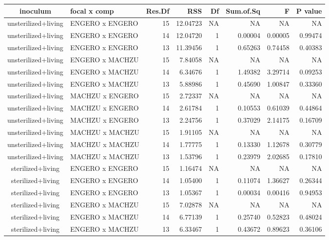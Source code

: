 \begin{table}[t]
\fontsize{12.0pt}{14.4pt}\selectfont
\begin{tabular*}{\linewidth}{@{\extracolsep{\fill}}clrrrrrr}
\toprule
inoculum & focal x comp & Res.Df & RSS & Df & Sum.of.Sq & F & P value \\ 
\midrule\addlinespace[2.5pt]
unsterilized+living & ENGERO x ENGERO & 15 & 12.04723 & NA & NA & NA & NA \\ 
unsterilized+living & ENGERO x ENGERO & 14 & 12.04720 & 1 & 0.00004 & 0.00005 & 0.99474 \\ 
unsterilized+living & ENGERO x ENGERO & 13 & 11.39456 & 1 & 0.65263 & 0.74458 & 0.40383 \\ 
unsterilized+living & ENGERO x MACHZU & 15 & 7.84058 & NA & NA & NA & NA \\ 
unsterilized+living & ENGERO x MACHZU & 14 & 6.34676 & 1 & 1.49382 & 3.29714 & 0.09253 \\ 
unsterilized+living & ENGERO x MACHZU & 13 & 5.88986 & 1 & 0.45690 & 1.00847 & 0.33360 \\ 
unsterilized+living & MACHZU x ENGERO & 15 & 2.72337 & NA & NA & NA & NA \\ 
unsterilized+living & MACHZU x ENGERO & 14 & 2.61784 & 1 & 0.10553 & 0.61039 & 0.44864 \\ 
unsterilized+living & MACHZU x ENGERO & 13 & 2.24756 & 1 & 0.37029 & 2.14175 & 0.16709 \\ 
unsterilized+living & MACHZU x MACHZU & 15 & 1.91105 & NA & NA & NA & NA \\ 
unsterilized+living & MACHZU x MACHZU & 14 & 1.77775 & 1 & 0.13330 & 1.12678 & 0.30779 \\ 
unsterilized+living & MACHZU x MACHZU & 13 & 1.53796 & 1 & 0.23979 & 2.02685 & 0.17810 \\ 
sterilized+living & ENGERO x ENGERO & 15 & 1.16474 & NA & NA & NA & NA \\ 
sterilized+living & ENGERO x ENGERO & 14 & 1.05400 & 1 & 0.11074 & 1.36627 & 0.26344 \\ 
sterilized+living & ENGERO x ENGERO & 13 & 1.05367 & 1 & 0.00034 & 0.00416 & 0.94953 \\ 
sterilized+living & ENGERO x MACHZU & 15 & 7.02878 & NA & NA & NA & NA \\ 
sterilized+living & ENGERO x MACHZU & 14 & 6.77139 & 1 & 0.25740 & 0.52823 & 0.48024 \\ 
sterilized+living & ENGERO x MACHZU & 13 & 6.33467 & 1 & 0.43672 & 0.89623 & 0.36106 \\ 

\end{tabular*}
\end{table}
